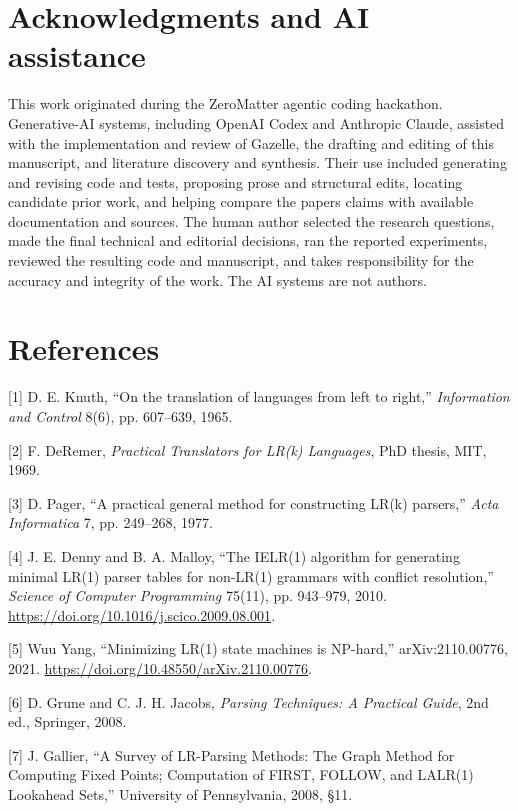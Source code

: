 \documentclass[
  10pt,
]{article}
\begin{document}
\hypertarget{acknowledgments-and-ai-assistance}{%
\section{Acknowledgments and AI
assistance}\label{acknowledgments-and-ai-assistance}}

This work originated during the ZeroMatter agentic coding hackathon.
Generative-AI systems, including OpenAI Codex and Anthropic Claude,
assisted with the implementation and review of Gazelle, the drafting and
editing of this manuscript, and literature discovery and synthesis.
Their use included generating and revising code and tests, proposing
prose and structural edits, locating candidate prior work, and helping
compare the paper\textquotesingle s claims with available documentation
and sources. The human author selected the research questions, made the
final technical and editorial decisions, ran the reported experiments,
reviewed the resulting code and manuscript, and takes responsibility for
the accuracy and integrity of the work. The AI systems are not authors.

\hypertarget{references}{%
\section{References}\label{references}}

{[}1{]} D. E. Knuth, ``On the translation of languages from left to
right,'' \emph{Information and Control} 8(6), pp. 607--639, 1965.

{[}2{]} F. DeRemer, \emph{Practical Translators for LR(k) Languages},
PhD thesis, MIT, 1969.

{[}3{]} D. Pager, ``A practical general method for constructing LR(k)
parsers,'' \emph{Acta Informatica} 7, pp. 249--268, 1977.

{[}4{]} J. E. Denny and B. A. Malloy, ``The IELR(1) algorithm for
generating minimal LR(1) parser tables for non-LR(1) grammars with
conflict resolution,'' \emph{Science of Computer Programming} 75(11),
pp. 943--979, 2010. \url{https://doi.org/10.1016/j.scico.2009.08.001}.

{[}5{]} Wuu Yang, ``Minimizing LR(1) state machines is NP-hard,''
arXiv:2110.00776, 2021. \url{https://doi.org/10.48550/arXiv.2110.00776}.

{[}6{]} D. Grune and C. J. H. Jacobs, \emph{Parsing Techniques: A
Practical Guide}, 2nd ed., Springer, 2008.

{[}7{]} J. Gallier, ``A Survey of LR-Parsing Methods: The Graph Method
for Computing Fixed Points; Computation of FIRST, FOLLOW, and LALR(1)
Lookahead Sets,'' University of Pennsylvania, 2008, §11.
\end{document}
